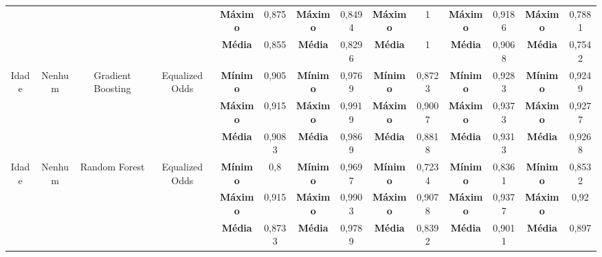 \documentclass[Portugues,Final]{ic-tese-v3}
\begin{document}
\begin{table}[H]
\begin{center}
{\begin{tabular}{c|c|c|c|c|c|c|c|c|c|c|c|c|c}
             & & & & \textbf{Máximo} & 0,875 & \textbf{Máximo} & 0,8494 & \textbf{Máximo} & 1 & \textbf{Máximo} & 0,9186 & \textbf{Máximo} & 0,7881 \\
             & & & & \textbf{Média} & 0,855 & \textbf{Média} & 0,8296 & \textbf{Média} & 1 & \textbf{Média} & 0,9068 & \textbf{Média} & 0,7542 \\
            \hline
            \multirow{3}{*}{Idade} & \multirow{3}{*}{Nenhum} & \multirow{3}{*}{Gradient Boosting} & \multirow{3}{*}{Equalized Odds} & \textbf{Mínimo} & 0,905 & \textbf{Mínimo} & 0,9769 & \textbf{Mínimo} & 0,8723 & \textbf{Mínimo} & 0,9283 & \textbf{Mínimo} & 0,9249 \\
             & & & & \textbf{Máximo} & 0,915 & \textbf{Máximo} & 0,9919 & \textbf{Máximo} & 0,9007 & \textbf{Máximo} & 0,9373 & \textbf{Máximo} & 0,9277 \\
             & & & & \textbf{Média} & 0,9083 & \textbf{Média} & 0,9869 & \textbf{Média} & 0,8818 & \textbf{Média} & 0,9313 & \textbf{Média} & 0,9268 \\
            \hline
            \multirow{3}{*}{Idade} & \multirow{3}{*}{Nenhum} & \multirow{3}{*}{Random Forest} & \multirow{3}{*}{Equalized Odds} & \textbf{Mínimo} & 0,8 & \textbf{Mínimo} & 0,9697 & \textbf{Mínimo} & 0,7234 & \textbf{Mínimo} & 0,8361 & \textbf{Mínimo} & 0,8532 \\
             & & & & \textbf{Máximo} & 0,915 & \textbf{Máximo} & 0,9903 & \textbf{Máximo} & 0,9078 & \textbf{Máximo} & 0,9377 & \textbf{Máximo} & 0,92 \\
             & & & & \textbf{Média} & 0,8733 & \textbf{Média} & 0,9789 & \textbf{Média} & 0,8392 & \textbf{Média} & 0,9011 & \textbf{Média} & 0,897 \\
        \end{tabular}}
    \end{center}
\end{table}
\end{document}
